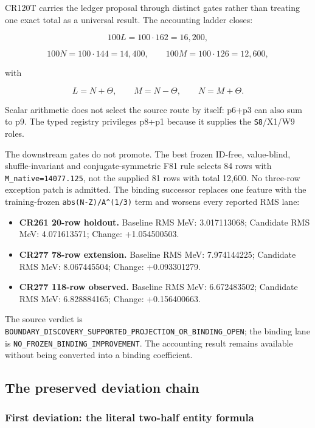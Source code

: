 CR120T carries the ledger proposal through distinct gates rather than
treating one exact total as a universal result. The accounting ladder
closes:

\[
100L=100\cdot162=16{,}200,
\]

\[
100N=100\cdot144=14{,}400,
\qquad
100M=100\cdot126=12{,}600,
\]

with

\[
L=N+\Theta,
\qquad M=N-\Theta,
\qquad N=M+\Theta.
\]

Scalar arithmetic does not select the source route by itself: p6+p3 can
also sum to p9. The typed registry privileges p8+p1 because it supplies
the \texttt{S8}/X1/W9 roles.

The downstream gates do not promote. The best frozen ID-free,
value-blind, shuffle-invariant and conjugate-symmetric F81 rule selects
84 rows with \texttt{M\_native=14077.125}, not the supplied 81 rows with
total 12,600. No three-row exception patch is admitted. The binding
successor replaces one feature with the training-frozen
\texttt{abs(N-Z)/A\^{}(1/3)} term and worsens every reported RMS lane:

\begin{itemize}
\tightlist
\item
  \textbf{CR261 20-row holdout.} Baseline RMS MeV: 3.017113068;
  Candidate RMS MeV: 4.071613571; Change: +1.054500503.
\item
  \textbf{CR277 78-row extension.} Baseline RMS MeV: 7.974144225;
  Candidate RMS MeV: 8.067445504; Change: +0.093301279.
\item
  \textbf{CR277 118-row observed.} Baseline RMS MeV: 6.672483502;
  Candidate RMS MeV: 6.828884165; Change: +0.156400663.
\end{itemize}

The source verdict is
\nolinkurl{BOUNDARY_DISCOVERY_SUPPORTED_PROJECTION_OR_BINDING_OPEN};
the binding lane is \nolinkurl{NO_FROZEN_BINDING_IMPROVEMENT}. The
accounting result remains available without being converted into a
binding coefficient.

\subsection{The preserved deviation
chain}\label{viii-ch05-the-preserved-deviation-chain}

\subsubsection{First deviation: the literal two-half entity
formula}\label{viii-ch05-first-deviation-the-literal-two-half-entity-formula}

